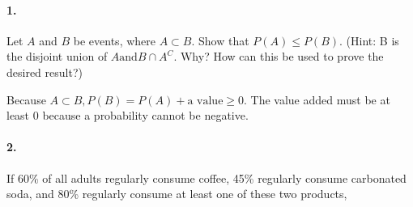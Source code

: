 

\graphicspath{ {./images/} }

\renewcommand\classname{STAT F300 Statistics, Dr. Short}

\renewcommand\assignment{Homework 3, Due Friday, February 3, 23:59}



    \iffalse
    \begin{equation*}
        \begin{gathered}
            Equations go here.
        \end{gathered}
    \end{equation*}

    \resizebox{\hsize}{!}{$Long equation goes here$}

    \begin{multicol*}{# of columns}
    \end{multicol*}

    \horizontal

    \fi


    \paragraph*{1.}
    Let $A$ and $B$ be events, where $A \subset B$. Show that $P (A) \leq P (B)$. (Hint: B is the disjoint union of $A \text{and} B \cap A^C$. Why? How can this be used to prove the desired result?)

    \begin{mdframed}
        Because $A \subset B, P(B) = P(A) + \text{a value}  \geq 0$. The value added must be at least 0 because a probability cannot be negative.
    \end{mdframed}

    \paragraph*{2.}
    If 60\% of all adults regularly consume coffee, 45\% regularly consume carbonated soda, and 80\% regularly consume at least one of these two products,

